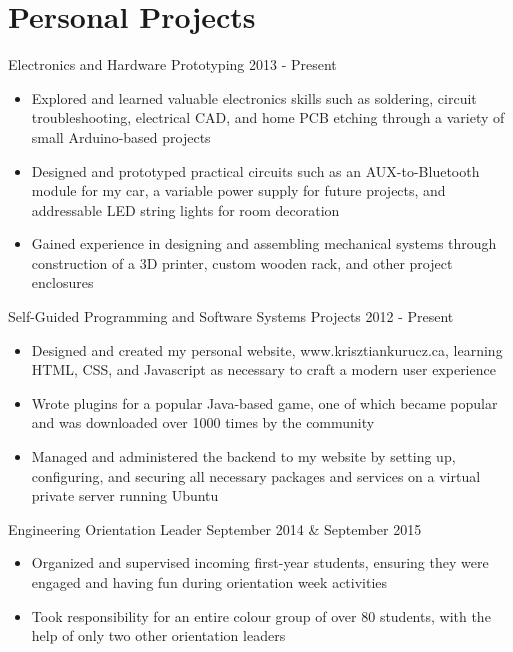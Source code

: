 \documentclass[hidelinks]{kkurucz-cv}
\begin{document}

\section{Personal Projects}
\begin{entrylist}
\entry
{\vspace{-8mm}\null}
{Electronics and Hardware Prototyping}
{2013 - Present}
{
\vspace{-3mm}
\begin{itemize}
	\item Explored and learned valuable electronics skills such as soldering, circuit troubleshooting, electrical CAD, and home PCB etching through a variety of small Arduino-based projects
	\item Designed and prototyped practical circuits such as an AUX-to-Bluetooth module for my car, a variable power supply for future projects, and addressable LED string lights for room decoration
	\item Gained experience in designing and assembling mechanical systems through construction of a 3D printer, custom wooden rack, and other project enclosures
\end{itemize}
}
{\null}
\entry
{\vspace{-8mm}\null}
{Self-Guided Programming and Software Systems Projects}
{2012 - Present}
{
\vspace{-3mm}
\begin{itemize}
	\item Designed and created my personal website, www.krisztiankurucz.ca, learning HTML, CSS, and Javascript as necessary to craft a modern user experience
	\item Wrote plugins for a popular Java-based game, one of which became popular and was downloaded over 1000 times by the community
	\item Managed and administered the backend to my website by setting up, configuring, and securing all necessary packages and services on a virtual private server running Ubuntu
\end{itemize}
}
{\null}
\entry
{\vspace{-8mm}\null}
{Engineering Orientation Leader}
{September 2014 \& September 2015}
{
\vspace{-3mm}
\begin{itemize}
	\item Organized and supervised incoming first-year students, ensuring they were engaged and having fun during orientation week activities
	\item Took responsibility for an entire colour group of over 80 students, with the help of only two other orientation leaders
	\end{itemize}
}
{\null}
\end{entrylist}
\end{document}
